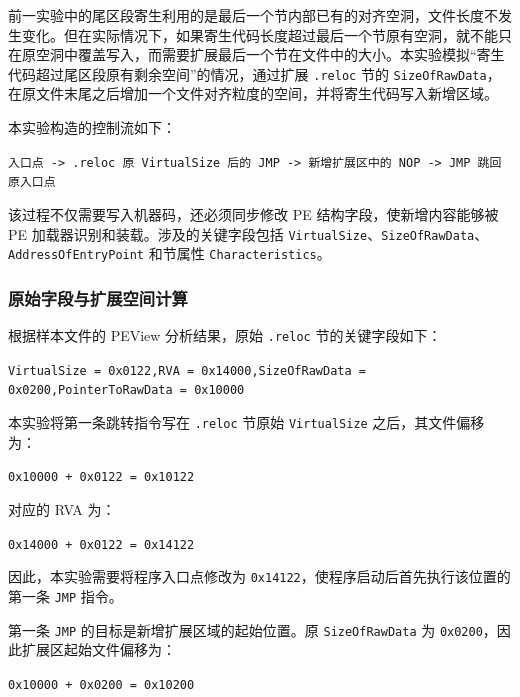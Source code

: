 ﻿\documentclass[12pt]{ctexart}
\begin{document}
前一实验中的尾区段寄生利用的是最后一个节内部已有的对齐空洞，文件长度不发生变化。但在实际情况下，如果寄生代码长度超过最后一个节原有空洞，就不能只在原空洞中覆盖写入，而需要扩展最后一个节在文件中的大小。本实验模拟“寄生代码超过尾区段原有剩余空间”的情况，通过扩展 \texttt{.reloc} 节的 \texttt{SizeOfRawData}，在原文件末尾之后增加一个文件对齐粒度的空间，并将寄生代码写入新增区域。

本实验构造的控制流如下：

\begin{center}
\texttt{入口点 -> .reloc 原 VirtualSize 后的 JMP -> 新增扩展区中的 NOP -> JMP 跳回原入口点}
\end{center}

该过程不仅需要写入机器码，还必须同步修改 PE 结构字段，使新增内容能够被 PE 加载器识别和装载。涉及的关键字段包括 \texttt{VirtualSize}、\texttt{SizeOfRawData}、\texttt{AddressOfEntryPoint} 和节属性 \texttt{Characteristics}。

\subsubsection{原始字段与扩展空间计算}

根据样本文件的 PEView 分析结果，原始 \texttt{.reloc} 节的关键字段如下：

\begin{center}
\texttt{VirtualSize = 0x0122,\quad RVA = 0x14000,\quad SizeOfRawData = 0x0200,\quad PointerToRawData = 0x10000}
\end{center}

本实验将第一条跳转指令写在 \texttt{.reloc} 节原始 \texttt{VirtualSize} 之后，其文件偏移为：

\begin{center}
\texttt{0x10000 + 0x0122 = 0x10122}
\end{center}

对应的 RVA 为：

\begin{center}
\texttt{0x14000 + 0x0122 = 0x14122}
\end{center}

因此，本实验需要将程序入口点修改为 \texttt{0x14122}，使程序启动后首先执行该位置的第一条 \texttt{JMP} 指令。

第一条 \texttt{JMP} 的目标是新增扩展区域的起始位置。原 \texttt{SizeOfRawData} 为 \texttt{0x0200}，因此扩展区起始文件偏移为：

\begin{center}
\texttt{0x10000 + 0x0200 = 0x10200}
\end{center}
\end{document}
